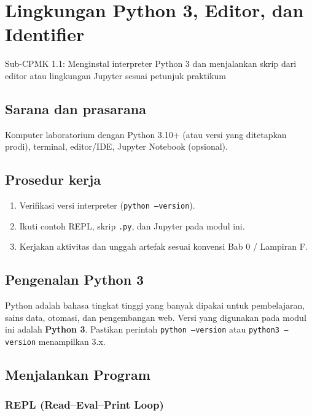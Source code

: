 \documentclass[../main.tex]{subfiles}
\begin{document}
\chapter{Lingkungan Python 3, Editor, dan Identifier}

\begin{subcpmk}
  \item Sub-CPMK 1.1: Menginstal interpreter Python 3 dan menjalankan skrip dari editor atau lingkungan Jupyter sesuai petunjuk praktikum
\end{subcpmk}


\section{Sarana dan prasarana}

Komputer laboratorium dengan Python 3.10+ (atau versi yang ditetapkan prodi), terminal, editor/IDE, Jupyter Notebook (opsional).

\section{Prosedur kerja}

\begin{enumerate}[leftmargin=*]
  \item Verifikasi versi interpreter (\texttt{python --version}).
  \item Ikuti contoh REPL, skrip \texttt{.py}, dan Jupyter pada modul ini.
  \item Kerjakan aktivitas dan unggah artefak sesuai konvensi Bab 0 / Lampiran F.
\end{enumerate}

\section{Pengenalan Python 3}

Python adalah bahasa tingkat tinggi yang banyak dipakai untuk pembelajaran, sains data, otomasi, dan pengembangan web. Versi yang digunakan pada modul ini adalah \textbf{Python 3}. Pastikan perintah \texttt{python --version} atau \texttt{python3 --version} menampilkan 3.x.

\section{Menjalankan Program}

\subsection{REPL (Read--Eval--Print Loop)}
\end{document}
